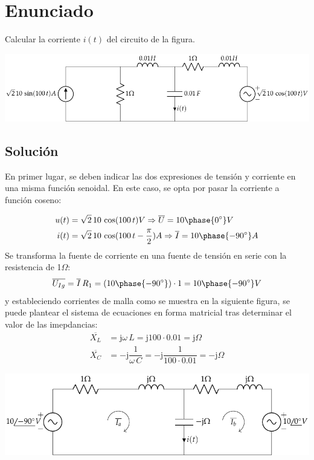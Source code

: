\section{Enunciado}

Calcular la corriente $i(t)$ del circuito de la figura.

\begin{center}
  \includegraphics{figuras/BT2_13.pdf}
\end{center}

\subsection*{Solución}

En primer lugar, se deben indicar las dos expresiones de tensión y
corriente en una misma función senoidal. En este caso, se opta por
pasar la corriente a función coseno:

\begin{align*}
  u(t)&=\sqrt{2}\,10\,\cos(100\,t) V\Rightarrow \overline{U}=10\phase{\ang{0}} V\\
  i(t)&=\sqrt{2}\,10\,\cos(100\,t-\frac{\pi}{2}) A\Rightarrow \overline{I}=10\phase{\ang{-90}} A
\end{align*}
Se transforma la fuente de corriente en una fuente de tensión en serie
con la resistencia de 1$\Omega$:
\begin{equation*}
  \overline{U_{Ig}}=\overline{I}\, R_{1}=(10\phase{\ang{-90}})\cdot 1=10\phase{\ang{-90}} V
\end{equation*}
y estableciendo corrientes de malla como se muestra en la siguiente
figura, se puede plantear el sistema de ecuaciones en forma matricial
tras determinar el valor de las imepdancias:
\begin{align*}
  \overline{X_L}&=\mathrm{j}\omega\,L=\mathrm{j} 100\cdot 0.01= \mathrm{j}\Omega\\
  \overline{X_C}&=-\mathrm{j}\dfrac{1}{\omega\,C}=-\mathrm{j} \dfrac{1}{100\cdot 0.01}= -\mathrm{j}\Omega
\end{align*}

\begin{center}
  \includegraphics{figuras/BT2_13_mod.pdf}
\end{center}

